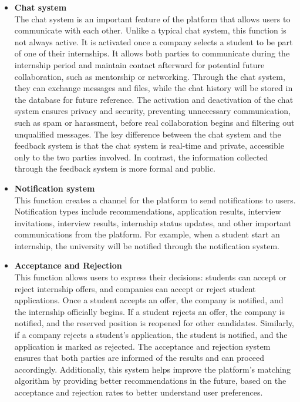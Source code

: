 \begin{itemize}[label={ }]
    \item \textcolor{bluepoli}{\textbf{Chat system}}
    \\The chat system is an important feature of the platform that allows users to communicate with each other. Unlike a typical chat system, this function
    is not always active. It is activated once a company selects a student to be part of one of their internships. 
    It allows both parties to communicate during the internship period and maintain contact afterward for potential future collaboration, such as mentorship 
    or networking. Through the chat system, they can exchange messages and files, while the chat history will be stored in the database for future reference.
    The activation and deactivation of the chat system ensures privacy and security, preventing unnecessary communication, such as spam or harassment, 
    before real collaboration begins and filtering out unqualified messages.
    The key difference between the chat system and the feedback system is that the chat system is real-time and private, accessible only to the two parties 
    involved. In contrast, the information collected through the feedback system is more formal and public.

    \item \textcolor{bluepoli}{\textbf{Notification system}}
    \\This function creates a channel for the platform to send notifications to users. Notification types include recommendations, application results,
    interview invitations, interview results, internship status updates, and other important communications from the platform. For example, when a student
    start an internship, the university will be notified through the notification system.

    \item \textcolor{bluepoli}{\textbf{Acceptance and Rejection}}
    \\This function allows users to express their decisions: students can accept or reject internship offers, and companies can accept or reject student applications.
    Once a student accepts an offer, the company is notified, and the internship officially begins. If a student rejects an offer, the company is notified, and the 
    reserved position is reopened for other candidates. Similarly, if a company rejects a student’s application, the student is notified, and the application is 
    marked as rejected.
    The acceptance and rejection system ensures that both parties are informed of the results and can proceed accordingly. Additionally, this system helps 
    improve the platform's matching algorithm by providing better recommendations in the future, based on the acceptance and rejection rates to better understand 
    user preferences.
\end{itemize}

